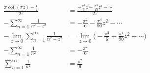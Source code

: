 \begin{align}
\frac{\pi\cot(\pi z) - \frac{1}{z}}{2z} &= \frac{- \frac{\pi^2}{3}z - \frac{\pi^4}{45}z^3-\cdots}{2z}\\
-\sum_{n=1}^{\infty}\frac{1}{n^2 - z^2}&= -\frac{\pi^2}{6} - \frac{\pi^4}{90}z^2 - \cdots\\
-\lim_{z\to 0}\sum_{n=1}^{\infty}\frac{1}{n^2 - z^2}&= \lim_{z\to 0}\Big(-\frac{\pi^2}{6} - \frac{\pi^4}{90}z^2 - \cdots\Big)\\
-\sum_{n=1}^{\infty}\frac{1}{n^2}&= -\frac{\pi^2}{6}\\
\sum_{n=1}^{\infty}\frac{1}{n^2}&= \frac{\pi^2}{6}
\end{align}
